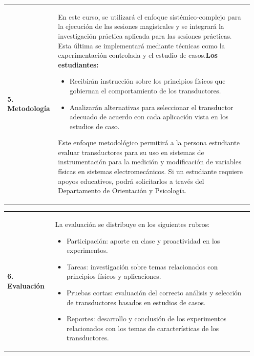 \documentclass[letterpaper]{article}%
\begin{document}
\begin{tabularx}{\textwidth}{p{3cm}p{13cm}}%
\par\fontsize{12}{14}\selectfont \textbf{\textcolor{parte}{5. Metodología}}&En este curso, se utilizará el enfoque sistémico-complejo para la ejecución de las sesiones magistrales y se integrará la investigación práctica aplicada para las sesiones prácticas. Esta última se implementará mediante técnicas como la experimentación controlada y el estudio de casos.\newline\newline \textbf{Los estudiantes:}\begin{itemize}\item Recibirán instrucción sobre los principios físicos que gobiernan el comportamiento de los transductores.\item Analizarán alternativas para seleccionar el transductor adecuado de acuerdo con cada aplicación vista en los estudios de caso.\end{itemize}\vspace*{2mm}Este enfoque metodológico permitirá a la persona estudiante evaluar transductores para su uso en sistemas de instrumentación para la medición y modificación de variables físicas en sistemas electromecánicos.\vspace*{2mm} \newline  Si un estudiante requiere apoyos educativos, podrá solicitarlos a través del Departamento de Orientación y Psicología.\\%
\end{tabularx}%
\vspace*{2mm}%
\newline%
\begin{tabularx}{\textwidth}{p{3cm}p{13cm}}%
\par\fontsize{12}{14}\selectfont \textbf{\textcolor{parte}{6. Evaluación}}&La evaluación se distribuye en los siguientes rubros:\vspace*{1mm} \newline  \begin{itemize} \item Participación: aporte en clase y proactividad en los experimentos. \item Tareas: investigación sobre temas relacionados con principios físicos y aplicaciones. \item Pruebas cortas: evaluación del correcto análisis y selección de transductores basados en estudios de casos. \item Reportes: desarrollo y conclusión de los experimentos relacionados con los temas de características de los transductores. \end{itemize}\\%
\end{tabularx}%
\end{document}
